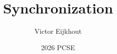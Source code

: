 \documentclass[10pt]{beamer}
\begin{document}
\author[Eijkhout]{Victor Eijkhout}
\date[2026]{2026 PCSE}
\title[sync]{Synchronization}
\maketitle


\end{document}
